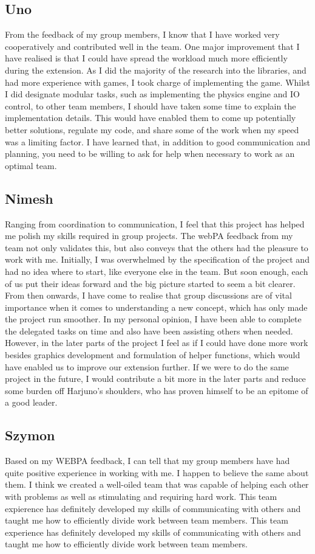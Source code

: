 \documentclass[11pt]{article}
\begin{document}
\subsection{Uno}
From the feedback of my group members, I know that I have worked very cooperatively and contributed well in the team. One major improvement that I have realised is that I could have spread the workload much more efficiently during the extension. As I did the majority of the research into the libraries, and had more experience with games, I took charge of implementing the game. Whilst I did designate modular tasks, such as implementing the physics engine and IO control, to other team members, I should have taken some time to explain the implementation details. This would have enabled them to come up potentially better solutions, regulate my code, and share some of the work when my speed was a limiting factor. I have learned that, in addition to good communication and planning, you need to be willing to ask for help when necessary to work as an optimal team.
\subsection{Nimesh}
Ranging from coordination to communication, I feel that this project has helped me polish my skills required in group projects. The webPA feedback from my team not only validates this, but also conveys that the others had the pleasure to work with me. Initially, I was overwhelmed by the specification of the project and had no idea where to start, like everyone else in the team. But soon enough, each of us put their ideas forward and the big picture started to seem a bit clearer. From then onwards, I have come to realise that group discussions are of vital importance when it comes to understanding a new concept, which has only made the project run smoother. In my personal opinion, I have been able to complete the delegated tasks on time and also have been assisting others when needed. However, in the later parts of the project I feel as if I could have done more work besides graphics development and formulation of helper functions, which would have enabled us to improve our extension further. If we were to do the same project in the future, I would contribute a bit more in the later parts and reduce some burden off Harjuno's shoulders, who has proven himself to be an epitome of a good leader.
\subsection{Szymon}
Based on my WEBPA feedback, I can tell that my group members have had quite positive experience in working with me. I happen to believe the same about them. I think we created a well-oiled team that was capable of helping each other with problems as well as stimulating and requiring hard work. This team expierence has definitely developed my skills of communicating with others and taught me how to efficiently divide work between team members. This team experience has definitely developed my skills of communicating with others and taught me how to efficiently divide work between team members.
\end{document}
